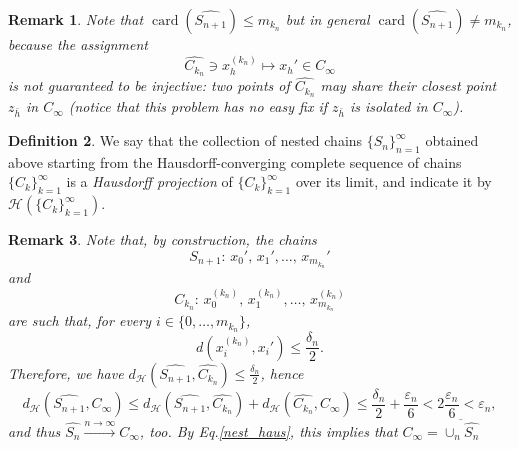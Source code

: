 \documentclass[10pt,a4paper]{article}
\theoremstyle{definition}
\newtheorem{defi}{Definition}[section]
\theoremstyle{remark}
\theoremstyle{plain}
\newtheorem{rem}[defi]{Remark}
\begin{document}
    \begin{rem}\label{inj__}
           Note that $\operatorname{card}(\widehat{S_{n+1}})\le m_{k_n}$ but in general  $\operatorname{card}(\widehat{S_{n+1}})\ne m_{k_n}$, because the assignment
    $$\widehat{C_{k_n}}\ni x_h^{(k_n)}\mapsto x_h'\in C_\infty$$
    is not guaranteed to be injective: two points of $\widehat{C_{k_n}}$ may share their closest point $z_{\bar{h}}$ in $C_\infty$ (notice that this problem has no easy fix if $z_{\bar{h}}$ is isolated in $C_\infty$).
    \end{rem}
    
    \begin{defi}\label{hauspro}
        We say that the collection of nested chains $\{S_n\}_{n=1}^\infty$ obtained above starting from the Hausdorff-converging complete sequence of chains $\{C_k\}_{k=1}^\infty$ is a \emph{Hausdorff projection} of $\{C_k\}_{k=1}^\infty$ over its limit, and indicate it by $\mathcal{H}(\{C_k\}_{k=1}^\infty)$.
    \end{defi}

\begin{rem}\label{S_n->C_infty}
    Note that, by construction, the chains
    $$S_{n+1}:\,x_0',\,x_1',\dots,\,x_{m_{k_n}}'$$
    and
    $$C_{k_n}:\,x_0^{(k_n)},\,x^{(k_n)}_1,\dots,\,x_{m_{k_n}}^{(k_n)}$$
    are such that, for every $i\in\{0,\dots,m_{k_n}\}$,
    $$d(x^{(k_n)}_i,x_i')\le\frac{\delta_n}{2}.$$
    Therefore, we have $d_\mathcal{H}(\widehat{S_{n+1}},\widehat{C_{k_n}})\le\frac{\delta_n}{2}$, hence
    $$d_\mathcal{H}(\widehat{S_{n+1}},C_\infty)\le d_\mathcal{H}(\widehat{S_{n+1}},\widehat{C_{k_n}})+d_\mathcal{H}(\widehat{C_{k_n}},C_\infty)\le \frac{\delta_n}{2}+\frac{\varepsilon_n}{6}<2\frac{\varepsilon_n}{6}<\varepsilon_n,$$
    and thus $\widehat{S_n}\xrightarrow{n\to\infty}C_\infty$, too. By Eq.\eqref{nest_haus}, this implies that $C_\infty=\overline{\cup_n \widehat{S_n}}$
\end{rem}
\end{document}
